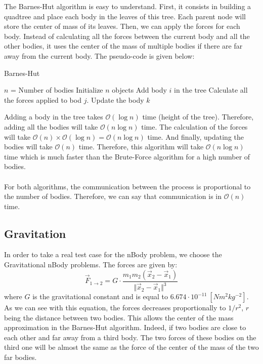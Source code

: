 \documentclass[11pt,a4paper]{article}
\begin{document}
The Barnes-Hut algorithm is easy to understand. First, it consists in building a quadtree and place each body in the leaves of this tree. Each parent node will store the center of mass of its leaves. Then, we can apply the forces for each body. Instead of calculating all the forces between the current body and all the other bodies, it uses the center of the mass of multiple bodies if there are far away from the current body. The pseudo-code is given below:
\begin{algorithm}
\caption{Barnes-Hut}\label{bh}
\begin{algorithmic}[1]
\State $n$ = Number of bodies
\State Initialize $n$ objects
\State	Add body $i$ in the tree
\EndFor
{} 
\State	Calculate all the forces applied to bod $j$.
\EndFor	
{}
\State Update the body $k$
\EndFor
\EndWhile
\end{algorithmic}
\end{algorithm}

Adding a body in the tree takes $\mathcal{O}(\log n)$ time (height of the tree). Therefore, adding all the bodies will take $\mathcal{O}(n\log n)$ time. The calculation of the forces will take $\mathcal{O}(n) \times \mathcal{O}(\log n) = \mathcal{O}(n\log n)$ time. And finally, updating the bodies will take $\mathcal{O}(n)$ time. Therefore, this algorithm will take $\mathcal{O}(n\log n)$ time which is much faster than the Brute-Force algorithm for a high number of bodies.
\\\\
For both algorithms, the communication between the process is proportional to the number of bodies. Therefore, we can say that communication is in $\mathcal{O}(n)$ time.

\subsection{Gravitation} 

In order to take a real test case for the nBody problem, we choose the Gravitational nBody problems. The forces are given by:
\begin{equation}
\vec{F}_{1\rightarrow 2} = G\cdot\frac{m_1m_2(\vec{x}_2-\vec{x}_1)}{\Vert \vec{x}_2-\vec{x}_1\Vert^3}
\end{equation}
where $G$ is the gravitational constant and is equal to $6.674 \cdot 10^{-11}~[Nm^2kg^{-2}]$. As we can see with this equation, the forces decreases proportionally to $1/r^2$, $r$ being the distance between two bodies. This allows the center of the mass approximation in the Barnes-Hut algorithm. Indeed, if two bodies are close to each other and far away from a third body. The two forces of these bodies on the third one will be almost the same as the force of the center of the mass of the two far bodies.
\end{document}
